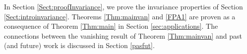 In Section \ref{Sect:proofInvariance}, we prove the  invariance properties of
Section \ref{Sect:introinvariance}. Theorems \ref{Thm:mainvan} and \ref{FPA1} are
proven as a consequence of Theorem \ref{Thm:main} in Section
 \ref{sec:applications}. The connections between the vanishing result of
 Theorem \ref{Thm:mainvan} and past (and future) work is discussed in Section \ref{pasfut}.

